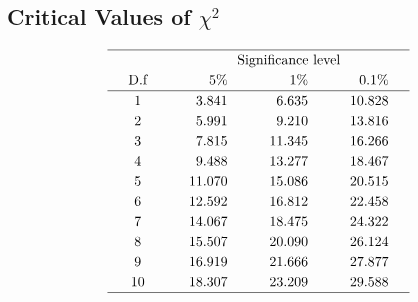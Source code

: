 \documentclass[svgnames, a5paper]{article}
\theoremstyle{definition}
\theoremstyle{remark}
\begin{document}
\begin{appendices}
\section{Critical Values of $\chi^2$}
\begin{equation*}
\arraycolsep=15pt\def\arraystretch{1.2}
\begin{array}{crrr}
\hline
& \multicolumn{3}{c}{\text{Significance level}}\\
\text{D.f} & 5\% & 1\% & 0.1\% \\
\hline
1 & 3.841  &   6.635  & 10.828 \\
2 & 5.991  &   9.210  & 13.816 \\
3 & 7.815  &   11.345 &  16.266 \\
4 & 9.488  &   13.277 &  18.467 \\
5 & 11.070 &   15.086 &  20.515 \\
6 & 12.592 &   16.812 &  22.458 \\
7 & 14.067 &   18.475 &  24.322 \\
8 & 15.507 &   20.090 &  26.124 \\
9 & 16.919 &   21.666 &  27.877 \\
10 & 18.307 &  23.209 &  29.588 \\
\hline
\end{array}
\end{equation*}
\end{appendices}
\end{document}
